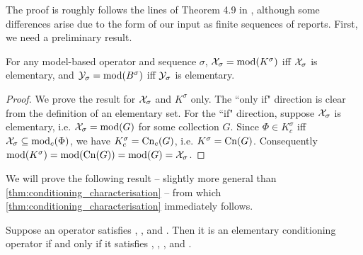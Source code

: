 The proof is roughly follows the lines of Theorem 4.9 in
\cite{delgrande2018general}, although some
differences arise due to the form of our input as finite sequences of reports.
First, we need a preliminary result.

\begin{lemma}
\label{lemma:model_based_elementary}
    For any model-based operator and sequence $\sigma$, $\mathcal{X}_\sigma =
    \operatorname{mod}(K^\sigma)$ iff $\mathcal{X}_\sigma$ is elementary, and $\mathcal{Y}_\sigma =
    \operatorname{mod}(B^\sigma)$ iff $\mathcal{Y}_\sigma$ is elementary.
\end{lemma}

\begin{proof}
We prove the result for $\mathcal{X}_\sigma$ and $K^\sigma$ only. The ``only if"
direction is clear from the definition of an elementary set. For the ``if"
direction, suppose $\mathcal{X}_\sigma$ is elementary, i.e. $\mathcal{X}_\sigma = \operatorname{mod}(G)$ for
some collection $G$. Since $\Phi \in K^\sigma_c$ iff $\mathcal{X}_\sigma \subseteq
\operatorname{mod}_c(\Phi)$, we have $K^\sigma_c = \operatorname{Cn}_c(G)$, i.e. $K^\sigma = \operatorname{Cn}(G)$.
Consequently $\operatorname{mod}(K^\sigma) = \operatorname{mod}(\operatorname{Cn}(G)) = \operatorname{mod}(G) = \mathcal{X}_\sigma$.
\end{proof}

We will prove the following result -- slightly more general than
\cref{thm:conditioning_characterisation} -- from which
\cref{thm:conditioning_characterisation} immediately follows.

\begin{proposition}
    \label{prop:conditioning_pre_characterisation}
    Suppose an operator satisfies \closure{}, \containment{},
    \kconj{} and \equivpost{}. Then it is an elementary
    conditioning operator if and only if it satisfies \rearr{},
    \duprem{}, \condcons{},
    \incvac{} and \acyc{}.
\end{proposition}

